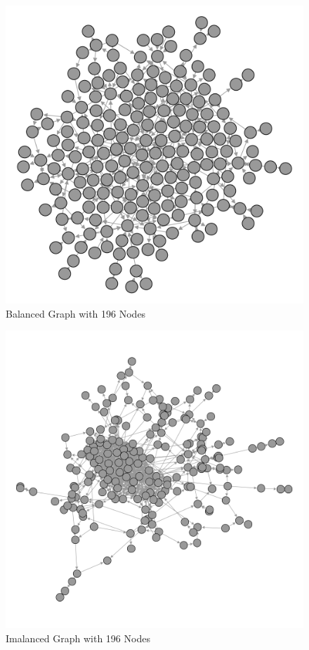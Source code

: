 \documentclass[]{report}
\begin{document}
\begin{figure}
\label{img:ex-noncrunch}
\begin{center}
\includegraphics[scale=0.25]{non-crunch.png}
\end{center}
\caption{Balanced Graph with 196 Nodes}
\end{figure}
\begin{figure}
\label{img:ex-crunch}
\begin{center}
\includegraphics[scale=0.25]{crunched.png}
\end{center}
\caption{Imalanced Graph with 196 Nodes}
\end{figure}
\end{document}
